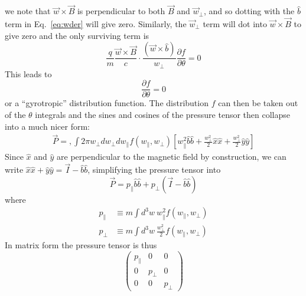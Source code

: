we note that $\vec w\times\vec B$ is perpendicular to both $\vec B$ and $\vec w_\perp$, and so dotting with the $\hat b$ term in Eq.~\ref{eq:wder} will give zero. Similarly, the $\vec w_\perp$ term will dot into $\vec w\times\vec B$ to give zero and the only surviving term is
\begin{equation*}
  \frac qm\frac{\vec w\times\vec B}{c}\cdot\frac{(\vec w\times\hat b)}{w_\perp}\frac{\partial f}{\partial \theta}=0
\end{equation*}
This leads to
\begin{equation*}
  \frac{\partial f}{\partial\theta}=0
\end{equation*}
or a ``gyrotropic'' distribution function. The distribution $f$ can then be taken out of the $\theta$ integrals and the sines and cosines of the pressure tensor then collapse into a much nicer form:
\begin{align*}
  \vec P=,\int2\pi w_{\perp}dw_{\perp}dw_{\parallel}f(w_\parallel,w_\perp)\left[w_\parallel^2\hat b\hat b+\frac{w_\perp^2}2\hat x\hat x+\frac{w_\perp^2}2\hat y\hat y\right]
\end{align*}
Since $\hat x$ and $\hat y$ are perpendicular to the magnetic field by construction, we can write $\hat x\hat x+\hat y\hat y=\vec I-\hat b\hat b$, simplifying the pressure tensor into
\begin{equation}
  \vec P=p_\parallel\hat b\hat b+p_\perp(\vec I-\hat b\hat b)
\end{equation}
where
\begin{align}
  p_\parallel&\equiv m\int d^3w~w_\parallel^2f(w_\parallel,w_\perp)\\
  p_\perp &\equiv m\int d^3w~\frac{w_\perp^2}2f(w_\parallel,w_\perp)
\end{align}
In matrix form the pressure tensor is thus
\begin{equation}
  \begin{pmatrix}
  p_\parallel & 0 & 0\\
  0 & p_\perp & 0\\
  0 & 0 & p_\perp
  \end{pmatrix}
\end{equation}
